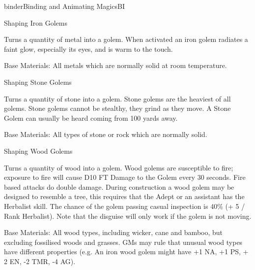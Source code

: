 \begin{College}[1.2]{binder}{Binding and Animating Magics}{BI}
\begin{ritual}[R-5]{Shaping Iron Golems}
\begin{effects}
Turns a quantity of metal into a golem.  When activated an iron golem
radiates a faint glow, especially its eyes, and is warm to the touch.

Base Materials: All metals which are normally solid at room temperature.
\end{effects}
\end{ritual}

\begin{ritual}[R-6]{Shaping Stone Golems}
\materialcost{500 sp}
\begin{effects}
Turns a quantity of stone into a golem.  Stone golems are the heaviest
of all golems. Stone golems cannot be stealthy, they grind as they
move. A Stone Golem can usually be heard coming from 100 yards away.

Base Materials: All types of stone or rock which are normally solid.
\end{effects}
\end{ritual}

\begin{ritual}[R-7]{Shaping Wood Golems}
\materialcost{100 sp}
\begin{effects}
Turns a quantity of wood into a golem.  Wood golems are susceptible to
fire; exposure to fire will cause D10 FT Damage to the Golem every 30
seconds.  Fire based attacks do double damage.  During construction a
wood golem may be designed to resemble a tree, this requires that the
Adept or an assistant has the Herbalist skill.  The chance of the
golem passing casual inspection is 40\% (+ 5 / Rank Herbalist). Note
that the disguise will only work if the golem is not moving.

Base Materials: All wood types, including wicker, cane and bamboo, but
excluding fossilised woods and grasses.  GMs may rule that unusual
wood types have different properties (e.g. An iron wood golem might
have +1 NA, +1 PS, + 2 EN, -2 TMR, -4 AG).
\end{effects}
\end{ritual}



\end{College}
